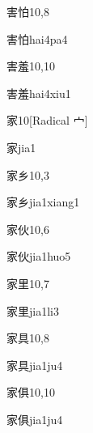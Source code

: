 \begin{entry}{害怕}{10,8}
  \begin{phonetics}{害怕}{hai4pa4}
  \end{phonetics}
\end{entry}

\begin{entry}{害羞}{10,10}
  \begin{phonetics}{害羞}{hai4xiu1}
  \end{phonetics}
\end{entry}

\begin{entry}{家}{10}[Radical 宀]
  \begin{phonetics}{家}{jia1}
  \end{phonetics}
\end{entry}

\begin{entry}{家乡}{10,3}
  \begin{phonetics}{家乡}{jia1xiang1}
  \end{phonetics}
\end{entry}

\begin{entry}{家伙}{10,6}
  \begin{phonetics}{家伙}{jia1huo5}
  \end{phonetics}
\end{entry}

\begin{entry}{家里}{10,7}
  \begin{phonetics}{家里}{jia1li3}
  \end{phonetics}
\end{entry}

\begin{entry}{家具}{10,8}
  \begin{phonetics}{家具}{jia1ju4}
  \end{phonetics}
\end{entry}

\begin{entry}{家俱}{10,10}
  \begin{phonetics}{家俱}{jia1ju4}
  \end{phonetics}
\end{entry}

